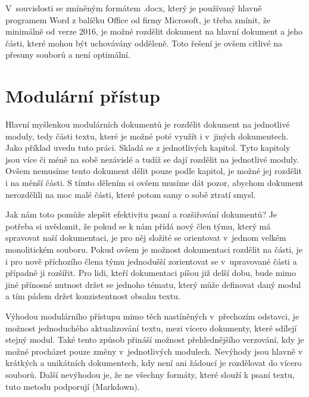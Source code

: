 V~souvislosti se zmíněným formátem .docx, který je používaný hlavně programem Word z balíčku Office od firmy Microsoft, je třeba zmínit, že minimálně od verze 2016, je
možné rozdělit dokument na hlavní dokument a jeho části, které mohou být uchovávány odděleně. \cite{msWord} Toto řešení je ovšem citlivé na přesuny souborů
a není optimální.

\section{Modulární přístup}

Hlavní myšlenkou modulárních dokumentů je rozdělit dokument na jednotlivé moduly, tedy části textu, které je možné poté využít i v~jiných dokumentech. Jako příklad uvedu
tuto práci. Skladá se z jednotlivých kapitol. Tyto kapitoly jsou více či méně na sobě nezávislé a tudíž se dají rozdělit na jednotlivé moduly. Ovšem nemusíme tento
dokument dělit pouze podle kapitol, je možné jej rozdělit i na měnší části. S tímto dělením si ovšem musíme dát pozor, abychom dokument nerozdělili na moc malé části,
které potom samy o sobě ztratí smysl.

Jak nám toto pomůže zlepšit efektivitu psaní a rozšiřování dokumentů? Je potřeba si uvědomit, že pokud se k nám přídá nový člen týmu, který má spravovat naší
dokumentaci, je pro něj složité se orientovat v~jednom velkém monolitickém souboru. Pokud ovšem je možnost dokumentaci rozdělit
na části, je i pro nově příchozího člena týmu jednodušší zorientovat se v~upravované části a případně ji rozšířit. Pro lidi, kteří dokumentaci píšou již delší dobu, bude mimo jiné přínosné
nutnost držet se jednoho tématu, který může definovat daný modul a tím pádem držet konzistentnost obsahu textu. \cite{modularDocuments}

Výhodou modulárního přístupu mimo těch nastíněných v~přechozím odstavci, je možnost jednoduchého aktualizování textu, mezi vícero dokumenty, které sdílejí stejný modul. Také
tento způsob přináší možnost přehlednějšího verzování, kdy je možné procházet pouze změny v~jednotlivých modulech. Nevýhody jsou hlavně v krátkých a unikátních dokumentech,
kdy není ani žádoucí je rozdělovat do vícero souborů. Další nevýhodou je, že ne všechny formáty, které slouží k psaní textu, tuto metodu podporují (Markdown).
